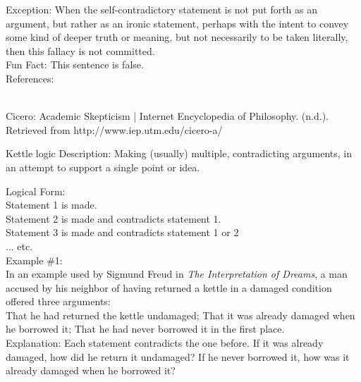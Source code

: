 \documentclass[a4paper,12pt,single,pdftex]{scrartcl}
\begin{document}
{    
      Exception: When the self-contradictory statement is not put forth as an argument, but rather as an ironic statement, perhaps with the intent to convey some kind of deeper truth or meaning, but not necessarily to be taken literally, then this fallacy is not committed.
    \\

    
      Fun Fact: This sentence is false.
    \\

    References:

    
      
        
      \\

      
        
          Cicero: Academic Skepticism | Internet Encyclopedia of Philosophy. (n.d.). Retrieved from http://www.iep.utm.edu/cicero-a/
        
      
    
  }


Kettle logic
    Description: Making (usually) multiple, contradicting arguments, in an attempt to support a single point or idea.

    
      Logical Form:
    \\

    
      Statement 1 is made.
    \\

    
      Statement 2 is made and contradicts statement 1.
    \\

    
      Statement 3 is made and contradicts statement 1 or 2
    \\

    
      ... etc.
    \\

    
      Example \#1:
    \\

    
      In an example used by Sigmund Freud in {\it The Interpretation of Dreams}, a man accused by his neighbor of having returned a kettle in a damaged condition offered three arguments:
    \\

    
      That he had returned the kettle undamaged; \newline
That it was already damaged when he borrowed it; \newline
That he had never borrowed it in the first place.
    \\

    
      Explanation: Each statement contradicts the one before. If it was already damaged, how did he return it undamaged? If he never borrowed it, how was it already damaged when he borrowed it?
    \\
\end{document}
